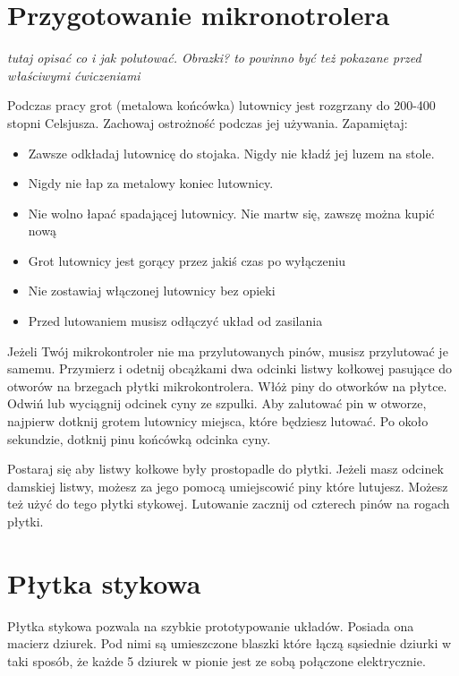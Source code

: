 \documentclass{pdfBooklets}
\begin{document}
\section{Przygotowanie mikronotrolera}
\textit{tutaj opisać co i jak polutować. Obrazki? to powinno być też pokazane przed właściwymi ćwiczeniami}
\begin{ProTip}{}
  Podczas pracy grot (metalowa końcówka) lutownicy jest rozgrzany do 200-400 stopni Celsjusza. Zachowaj ostrożność
  podczas jej używania. Zapamiętaj:
  \begin{itemize}
  \item Zawsze odkładaj lutownicę do stojaka. Nigdy nie kładź jej luzem na stole.
  \item Nigdy nie łap za metalowy koniec lutownicy.
  \item Nie wolno łapać spadającej lutownicy. Nie martw się, zawszę można kupić nową
  \item Grot lutownicy jest gorący przez jakiś czas po wyłączeniu
  \item Nie zostawiaj włączonej lutownicy bez opieki
  \item Przed lutowaniem musisz odłączyć układ od zasilania
  \end{itemize}
\end{ProTip}

Jeżeli Twój mikrokontroler nie ma przylutowanych pinów, musisz przylutować je samemu. Przymierz i odetnij
obcążkami dwa odcinki listwy kołkowej pasujące do otworów na brzegach płytki mikrokontrolera. Włóż piny do otworków
na płytce. Odwiń lub wyciągnij odcinek cyny ze szpulki. Aby zalutować pin w otworze, najpierw dotknij grotem lutownicy
miejsca, które będziesz lutować. Po około sekundzie, dotknij pinu końcówką odcinka cyny.

Postaraj się aby listwy kołkowe były prostopadle do płytki. Jeżeli masz odcinek damskiej listwy, możesz za jego pomocą
umiejscowić piny które lutujesz. Możesz też użyć do tego płytki stykowej. Lutowanie zacznij od czterech pinów na rogach płytki.


\section{Płytka stykowa}
  Płytka stykowa pozwala na szybkie prototypowanie układów. Posiada ona macierz dziurek. Pod nimi są umieszczone
  blaszki które łączą sąsiednie dziurki w taki sposób, że każde 5 dziurek w pionie jest ze sobą połączone elektrycznie.
  
\end{document}
